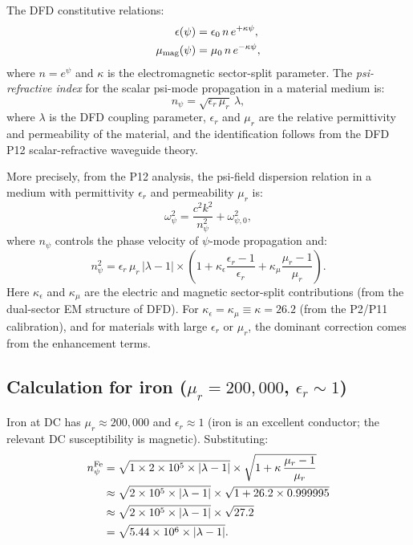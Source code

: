 \documentclass[11pt]{article}
\newcommand{\ee}[1]{\times 10^{#1}}
\begin{document}
The DFD constitutive relations:
\begin{align}
\epsilon(\psi) &= \epsilon_0\,n\,e^{+\kappa\psi}, \\
\mu_{\rm mag}(\psi) &= \mu_0\,n\,e^{-\kappa\psi},
\end{align}
where $n = e^\psi$ and $\kappa$ is the electromagnetic sector-split
parameter. The \emph{psi-refractive index} for the scalar psi-mode
propagation in a material medium is:
\begin{equation}
n_\psi = \sqrt{\epsilon_r\,\mu_r}\,\lambda,
\label{eq:n-psi-def}
\end{equation}
where $\lambda$ is the DFD coupling parameter, $\epsilon_r$ and $\mu_r$
are the relative permittivity and permeability of the material, and the
identification follows from the DFD P12 scalar-refractive waveguide
theory.

More precisely, from the P12 analysis, the psi-field dispersion relation
in a medium with permittivity $\epsilon_r$ and permeability $\mu_r$ is:
\begin{equation}
\omega_\psi^2 = \frac{c^2 k^2}{n_\psi^2} + \omega_{\psi,0}^2,
\label{eq:psi-dispersion}
\end{equation}
where $n_\psi$ controls the phase velocity of $\psi$-mode propagation and:
\begin{equation}
n_\psi^2 = \epsilon_r\,\mu_r\,|\lambda-1|
  \times \left(1 + \kappa_\epsilon\frac{\epsilon_r - 1}{\epsilon_r}
  + \kappa_\mu\frac{\mu_r - 1}{\mu_r}\right).
\label{eq:n-psi-full}
\end{equation}
Here $\kappa_\epsilon$ and $\kappa_\mu$ are the electric and magnetic
sector-split contributions (from the dual-sector EM structure of DFD).
For $\kappa_\epsilon = \kappa_\mu \equiv \kappa = 26.2$ (from the
P2/P11 calibration), and for materials with large $\epsilon_r$ or $\mu_r$,
the dominant correction comes from the enhancement terms.

\subsection{Calculation for iron ($\mu_r = 200{,}000$, $\epsilon_r \sim 1$)}

Iron at DC has $\mu_r \approx 200{,}000$ and $\epsilon_r \approx 1$
(iron is an excellent conductor; the relevant DC susceptibility is
magnetic). Substituting:
\begin{align}
n_\psi^{\rm Fe} &= \sqrt{1 \times 2\ee{5} \times |\lambda-1|}
  \times \sqrt{1 + \kappa\,\frac{\mu_r - 1}{\mu_r}} \notag\\
&\approx \sqrt{2\ee{5} \times |\lambda-1|} \times \sqrt{1 + 26.2 \times 0.999995} \notag\\
&\approx \sqrt{2\ee{5} \times |\lambda-1|} \times \sqrt{27.2} \notag\\
&= \sqrt{5.44\ee{6} \times |\lambda-1|}.
\label{eq:n-psi-Fe}
\end{align}
\end{document}
